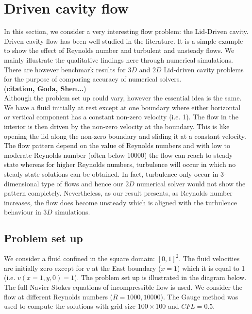 \newpage
\section{Driven cavity flow}
In this section, we consider a very interesting flow problem: the Lid-Driven cavity. Driven cavity flow has been well studied in the literature. It is a simple example to show the effect of Reynolds number and turbulent and unsteady flows. We mainly illustrate the qualitative findings here through numerical simulations. There are however benchmark results for $3D$ and $2D$ Lid-driven cavity problems for the purpose of comparing accuracy of numerical solvers.\\ (\textbf{citation, Goda, Shen...})\\

Although the problem set up could vary, however the essential idea is the same. We have a fluid initially at rest except at one boundary where either horizontal or vertical component has a constant non-zero velocity (i.e. 1). The flow in the interior is then driven by the non-zero velocity at the boundary. This is like opening the lid along the non-zero boundary and sliding it at a constant velocity. The flow pattern depend on the value of Reynolds numbers and with low to moderate Reynolds number (often below 10000) the flow can reach to steady state whereas for higher Reynolds numbers, turbulence will occur in which no steady state solutions can be obtained. In fact, turbulence only occur in 3-dimensional type of flows and hence our $2D$ numerical solver would not show the pattern completely. Nevertheless, as our result presents, as Reynolds number increases, the flow does become unsteady which is aligned with the turbulence behaviour in $3D$ simulations.

\subsection{Problem set up}
We consider a fluid confined in the square domain: $[0,1]^2$. The fluid velocities are initially zero except for $v$ at the East boundary ($x=1$) which it is equal to 1 (i.e. $v(x=1,y,0)=1$). The problem set up is illustrated in the diagram below. The full Navier Stokes equations of incompressible flow is used. We consider the flow at different Reynolds numbers ($R = 1000, 10000$). The Gauge method was used to compute the solutions with grid size $100 \times 100$ and $CFL = 0.5$. \\


